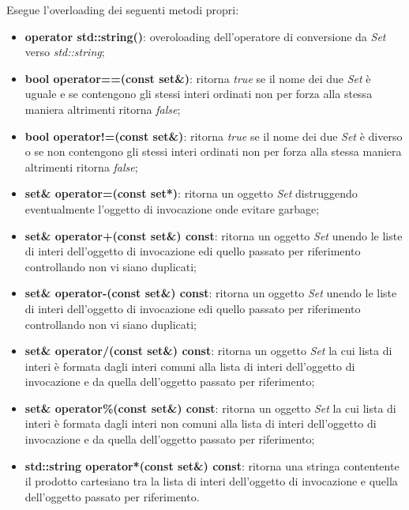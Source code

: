 \documentclass[a4paper,10pt]{article}
\begin{document}
    Esegue l'overloading dei seguenti metodi propri:
    \begin{itemize}
        \item \textbf{operator std::string()}: overoloading dell'operatore di conversione da \textit{Set} verso \textit{std::string};
        \item \textbf{bool operator==(const set\&)}: ritorna \textit{true} se il nome dei due \textit{Set} è uguale e se contengono gli stessi interi ordinati non per forza alla stessa maniera altrimenti ritorna \textit{false};
        \item \textbf{bool operator!=(const set\&)}: ritorna \textit{true} se il nome dei due \textit{Set} è diverso o se non contengono gli stessi interi ordinati non per forza alla stessa maniera altrimenti ritorna \textit{false};
        \item \textbf{set\& operator=(const set*)}: ritorna un oggetto \textit{Set} distruggendo eventualmente l'oggetto di invocazione onde evitare garbage;
        \item \textbf{set\& operator+(const set\&) const}: ritorna un oggetto \textit{Set} unendo le liste di interi dell'oggetto di invocazione edi quello passato per riferimento controllando non vi siano duplicati;
        \item \textbf{set\& operator-(const set\&) const}: ritorna un oggetto \textit{Set} unendo le liste di interi dell'oggetto di invocazione edi quello passato per riferimento controllando non vi siano duplicati;
        \item \textbf{set\& operator/(const set\&) const}: ritorna un oggetto \textit{Set} la cui lista di interi è formata dagli interi comuni alla lista di interi dell'oggetto di invocazione e da quella dell'oggetto passato per riferimento;
        \item \textbf{set\& operator\%(const set\&) const}: ritorna un oggetto \textit{Set} la cui lista di interi è formata dagli interi non comuni alla lista di interi dell'oggetto di invocazione e da quella dell'oggetto passato per riferimento;
        \item \textbf{std::string operator*(const set\&) const}: ritorna una stringa contentente il prodotto cartesiano tra la lista di interi dell'oggetto di invocazione e quella dell'oggetto passato per riferimento.
    \end{itemize}
\end{document}
